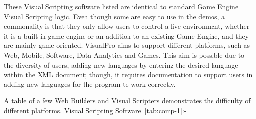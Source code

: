 \documentclass[12pt]{report} %
\begin{document}
		These Visual Scripting software listed are identical to standard Game Engine Visual Scripting logic. Even though some are easy to use in the demos, a commonality is that they only allow users to control a live environment, whether it is a built-in game engine or an addition to an existing Game Engine, and they are mainly game oriented. VisualPro aims to support different platforms, such as Web, Mobile, Software, Data Analytics and Games. This aim is possible due to the diversity of users, adding new languages by entering the desired language within the XML document; though, it requires documentation to support users in adding new languages for the program to work correctly.

		A table of a few Web Builders and Visual Scripters demonstrates the difficulty of different platforms. Visual Scripting Software~\ref{tab:comp-1}:-
\end{document}
